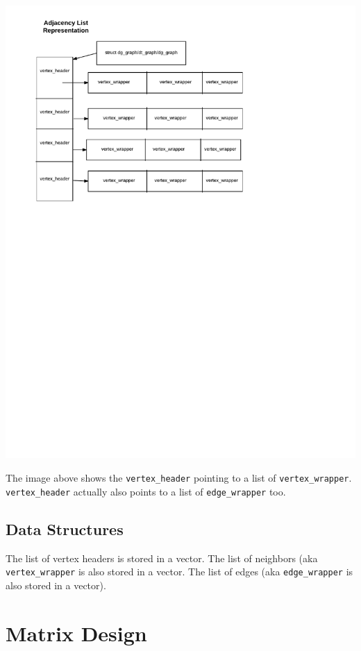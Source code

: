 \documentclass[12pt]{article}
\begin{document}
\includegraphics{al}

The image above shows the \texttt{vertex\_header} pointing to a list of \texttt{vertex\_wrapper}. \texttt{vertex\_header} actually also points to a list of \texttt{edge\_wrapper} too. 
\subsection{Data Structures}
The list of vertex headers is stored in a vector. The list of neighbors (aka \texttt{vertex\_wrapper} is also stored in a vector. The list of edges (aka \texttt{edge\_wrapper} is also stored in a vector).

\section{Matrix Design}
\end{document}
